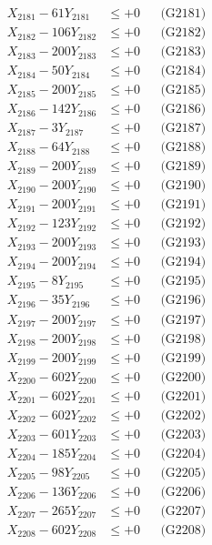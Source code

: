 \documentclass[a4paper,10pt]{article}
\begin{document}
{\begin{align}
\allowbreak
X_{2181} - 61Y_{2181} &\leq +0 && \text{(G2181)} \\
X_{2182} - 106Y_{2182} &\leq +0 && \text{(G2182)} \\
X_{2183} - 200Y_{2183} &\leq +0 && \text{(G2183)} \\
X_{2184} - 50Y_{2184} &\leq +0 && \text{(G2184)} \\
X_{2185} - 200Y_{2185} &\leq +0 && \text{(G2185)} \\
X_{2186} - 142Y_{2186} &\leq +0 && \text{(G2186)} \\
X_{2187} - 3Y_{2187} &\leq +0 && \text{(G2187)} \\
X_{2188} - 64Y_{2188} &\leq +0 && \text{(G2188)} \\
X_{2189} - 200Y_{2189} &\leq +0 && \text{(G2189)} \\
X_{2190} - 200Y_{2190} &\leq +0 && \text{(G2190)} \\
\allowbreak
X_{2191} - 200Y_{2191} &\leq +0 && \text{(G2191)} \\
X_{2192} - 123Y_{2192} &\leq +0 && \text{(G2192)} \\
X_{2193} - 200Y_{2193} &\leq +0 && \text{(G2193)} \\
X_{2194} - 200Y_{2194} &\leq +0 && \text{(G2194)} \\
X_{2195} - 8Y_{2195} &\leq +0 && \text{(G2195)} \\
X_{2196} - 35Y_{2196} &\leq +0 && \text{(G2196)} \\
X_{2197} - 200Y_{2197} &\leq +0 && \text{(G2197)} \\
X_{2198} - 200Y_{2198} &\leq +0 && \text{(G2198)} \\
X_{2199} - 200Y_{2199} &\leq +0 && \text{(G2199)} \\
X_{2200} - 602Y_{2200} &\leq +0 && \text{(G2200)} \\
\allowbreak
X_{2201} - 602Y_{2201} &\leq +0 && \text{(G2201)} \\
X_{2202} - 602Y_{2202} &\leq +0 && \text{(G2202)} \\
X_{2203} - 601Y_{2203} &\leq +0 && \text{(G2203)} \\
X_{2204} - 185Y_{2204} &\leq +0 && \text{(G2204)} \\
X_{2205} - 98Y_{2205} &\leq +0 && \text{(G2205)} \\
X_{2206} - 136Y_{2206} &\leq +0 && \text{(G2206)} \\
X_{2207} - 265Y_{2207} &\leq +0 && \text{(G2207)} \\
X_{2208} - 602Y_{2208} &\leq +0 && \text{(G2208)} \\

\end{align}}
\end{document}

